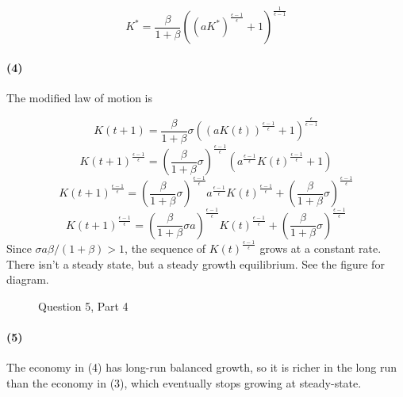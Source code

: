 \documentclass[10pt,letter]{article}
\newcommand{\problempart}[1]{\paragraph{#1}}
\begin{document}
\[ K^* = \frac{\beta}{1+\beta} \left( (aK^*)^{\frac{\epsilon-1}{\epsilon}} + 1 \right)^{\frac{1}{\epsilon - 1}} \]
\problempart{(4)}
The modified law of motion is

\[ K(t+1) = \frac{\beta}{1+\beta}\sigma \left( (aK(t))^{\frac{\epsilon-1}{\epsilon}} + 1 \right)^{\frac{\epsilon}{\epsilon - 1}} \]
\[ K(t+1)^{\frac{\epsilon-1}{\epsilon}} = \left(\frac{\beta}{1+\beta}\sigma\right)^{\frac{\epsilon-1}{\epsilon}} \left( a^{\frac{\epsilon-1}{\epsilon}}K(t)^{\frac{\epsilon-1}{\epsilon}} + 1 \right) \]
\[ K(t+1)^{\frac{\epsilon-1}{\epsilon}} =  \left(\frac{\beta}{1+\beta}\sigma\right)^{\frac{\epsilon-1}{\epsilon}} a^{\frac{\epsilon-1}{\epsilon}}K(t)^{\frac{\epsilon-1}{\epsilon}} + \left(\frac{\beta}{1+\beta}\sigma\right)^{\frac{\epsilon-1}{\epsilon}}  \]
\[ K(t+1)^{\frac{\epsilon-1}{\epsilon}} =  \left(\frac{\beta}{1+\beta}\sigma a\right)^{\frac{\epsilon-1}{\epsilon}} K(t)^{\frac{\epsilon-1}{\epsilon}} + \left(\frac{\beta}{1+\beta}\sigma\right)^{\frac{\epsilon-1}{\epsilon}}  \]
Since $\sigma a \beta / (1+\beta) > 1$, the sequence of $K(t)^{\frac{\epsilon-1}{\epsilon}}$ grows at a constant rate. There isn't a steady state, but a steady growth equilibrium. See the figure for diagram.
\begin{figure}
\begin{centering}
\caption{Question 5, Part 4}
\end{centering}
\end{figure}
\problempart{(5)}
The economy in (4) has long-run balanced growth, so it is richer in the long run than the economy in (3), which eventually stops growing at steady-state.
\end{document}
